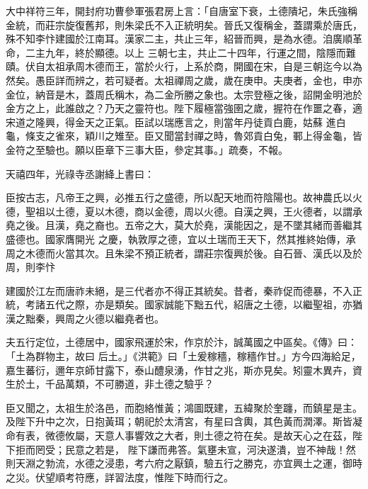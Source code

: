 \begin{pinyinscope}
 大中祥符三年，開封府功曹參軍張君房上言：「自唐室下衰，土德隤圮，朱氏強稱金統，而莊宗旋復舊邦，則朱梁氏不入正統明矣。晉氏又復稱金，蓋謂乘於唐氏，殊不知李忭建國於江南耳。漢家二主，共止三年，紹晉而興，是為水德。洎廣順革命，二主九年，終於顯德。以上
 三朝七主，共止二十四年，行運之間，陰隱而難賾。伏自太祖承周木德而王，當於火行，上系於商，開國在宋，自是三朝迄今以為然矣。愚臣詳而辨之，若可疑者。太祖禪周之歲，歲在庚申。夫庚者，金也，申亦金位，納音是木，蓋周氏稱木，為二金所勝之象也。太宗登極之後，詔開金明池於金方之上，此誰啟之？乃天之靈符也。陛下履極當強圉之歲，握符在作噩之春，適宋道之隆興，得金天之正氣。臣試以瑞應言之，則當年丹徒貢白鹿，姑蘇
 進白龜，條支之雀來，穎川之雉至。臣又聞當封禪之時，魯郊貢白兔，鄆上得金龜，皆金符之至驗也。願以臣章下三事大臣，參定其事。」疏奏，不報。



 天禧四年，光祿寺丞謝絳上書曰：



 臣按古志，凡帝王之興，必推五行之盛德，所以配天地而符陰陽也。故神農氏以火德，聖祖以土德，夏以木德，商以金德，周以火德。自漢之興，王火德者，以謂承堯之後。且漢，堯之裔也。五帝之大，莫大於堯，漢能因之，是不墜其緒而善繼其盛德也。國家膺開光
 之慶，執敦厚之德，宜以土瑞而王天下，然其推終始傳，承周之木德而火當其次。且朱梁不預正統者，謂莊宗復興於後。自石晉、漢氏以及於周，則李忭



 建國於江左而唐祚未絕，是三代者亦不得正其統矣。昔者，秦祚促而德暴，不入正統，考諸五代之際，亦是類矣。國家誠能下黜五代，紹唐之土德，以繼聖祖，亦猶漢之黜秦，興周之火德以繼堯者也。



 夫五行定位，土德居中，國家飛運於宋，作京於汴，誠萬國之中區矣。《傳》曰：「土為群物主，故曰
 后土。」《洪範》曰「土爰稼穡，稼穡作甘。」方今四海給足，嘉生蕃衍，邇年京師甘露下，泰山醴泉湧，作甘之兆，斯亦見矣。矧靈木異卉，資生於土，千品萬類，不可勝道，非土德之驗乎？



 臣又聞之，太祖生於洛邑，而胞絡惟黃；鴻圖既建，五緯聚於奎躔，而鎮星是主。及陛下升中之次，日抱黃珥；朝祀於太清宮，有星曰含輿，其色黃而潤澤。斯皆凝命有表，微德攸屬，天意人事響效之大者，則土德之符在矣。是故天心之在茲，陛下拒而罔受；民意之若是，
 陛下謙而弗答。氣壅未宣，河決遂潰，豈不神哉！然則天淵之勃流，水德之浸患，考六府之厭鎮，驗五行之勝克，亦宜興土之運，御時之災。伏望順考符應，詳習法度，惟陛下時而行之。




\end{pinyinscope}

